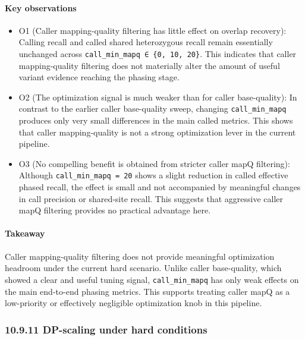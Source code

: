 \documentclass[
]{article}
\begin{document}
\paragraph{Key observations}\label{key-observations-16}

\begin{itemize}
\item
  O1 (Caller mapping-quality filtering has little effect on overlap
  recovery): Calling recall and called shared heterozygous recall remain
  essentially unchanged across
  \texttt{call\_min\_mapq\ ∈\ \{0,\ 10,\ 20\}}. This indicates that
  caller mapping-quality filtering does not materially alter the amount
  of useful variant evidence reaching the phasing stage.
\item
  O2 (The optimization signal is much weaker than for caller
  base-quality): In contrast to the earlier caller base-quality sweep,
  changing \texttt{call\_min\_mapq} produces only very small differences
  in the main called metrics. This shows that caller mapping-quality is
  not a strong optimization lever in the current pipeline.
\item
  O3 (No compelling benefit is obtained from stricter caller mapQ
  filtering): Although \texttt{call\_min\_mapq\ =\ 20} shows a slight
  reduction in called effective phased recall, the effect is small and
  not accompanied by meaningful changes in call precision or shared-site
  recall. This suggests that aggressive caller mapQ filtering provides
  no practical advantage here.
\end{itemize}

\paragraph{Takeaway}\label{takeaway-16}

Caller mapping-quality filtering does not provide meaningful
optimization headroom under the current hard scenario. Unlike caller
base-quality, which showed a clear and useful tuning signal,
\texttt{call\_min\_mapq} has only weak effects on the main end-to-end
phasing metrics. This supports treating caller mapQ as a low-priority or
effectively negligible optimization knob in this pipeline.

\subsubsection{10.9.11 DP-scaling under hard
conditions}\label{dp-scaling-under-hard-conditions}
\end{document}
